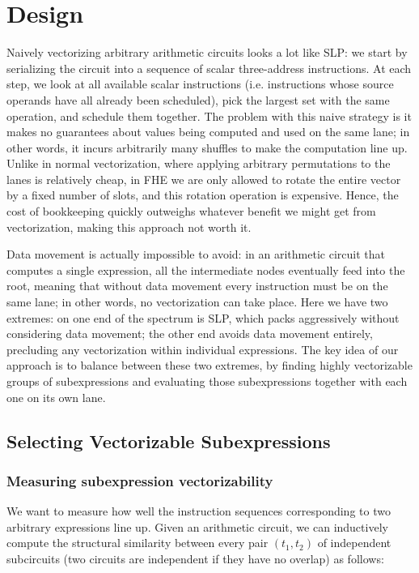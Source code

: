 \section{Design}\label{sec:design}
Naively vectorizing arbitrary arithmetic circuits looks a lot like SLP: we start by serializing the circuit into a sequence of scalar three-address instructions.
At each step, we look at all available scalar instructions (i.e. instructions whose source operands have all already been scheduled), pick the largest set with the same operation, and schedule them together.
The problem with this naive strategy is it makes no guarantees about values being computed and used on the same lane; in other words, it incurs arbitrarily many shuffles to make the computation line up.
Unlike in normal vectorization, where applying arbitrary permutations to the lanes is relatively cheap, in FHE we are only allowed to rotate the entire vector by a fixed number of slots, and this rotation operation is expensive.
Hence, the cost of bookkeeping quickly outweighs whatever benefit we might get from vectorization, making this approach not worth it.

Data movement is actually impossible to avoid: in an arithmetic circuit that computes a single expression, all the intermediate nodes eventually feed into the root, meaning that without data movement every instruction must be on the same lane; in other words, no vectorization can take place.
Here we have two extremes: on one end of the spectrum is SLP, which packs aggressively without considering data movement; the other end avoids data movement entirely, precluding any vectorization within individual expressions.
The key idea of our approach is to balance between these two extremes, by finding highly vectorizable groups of subexpressions and evaluating those subexpressions together with each one on its own lane.
\subsection{Selecting Vectorizable Subexpressions}\label{sec:selecting-subexpressions}
\subsubsection*{Measuring subexpression vectorizability}
We want to measure how well the instruction sequences corresponding to two arbitrary expressions line up.
Given an arithmetic circuit, we can inductively compute the structural similarity between every pair $(t_1, t_2)$ of independent subcircuits (two circuits are independent if they have no overlap) as follows: 

